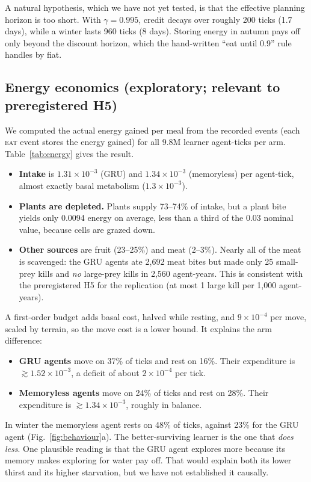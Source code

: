 \documentclass[10pt]{article}
\begin{document}
A natural hypothesis, which we have not yet tested, is that the effective planning horizon is too short. With
$\gamma=0.995$, credit decays over roughly 200 ticks (1.7 days), while a winter lasts 960 ticks (8 days).
Storing energy in autumn pays off only beyond the discount horizon, which the hand-written ``eat until 0.9'' rule
handles by fiat.

\subsection{Energy economics (exploratory; relevant to preregistered H5)}
\label{sec:energy}

We computed the actual energy gained per meal from the recorded events (each \textsc{eat} event stores the energy
gained) for all 9.8M learner agent-ticks per arm. Table~\ref{tab:energy} gives the result.
\begin{itemize}
\item \textbf{Intake} is $1.31\times10^{-3}$ (GRU) and $1.34\times10^{-3}$ (memoryless) per agent-tick, almost
exactly basal metabolism ($1.3\times10^{-3}$).
\item \textbf{Plants are depleted.} Plants supply 73--74\% of intake, but a plant bite yields only 0.0094 energy on
average, less than a third of the 0.03 nominal value, because cells are grazed down.
\item \textbf{Other sources} are fruit (23--25\%) and meat (2--3\%). Nearly all of the meat is scavenged: the GRU
agents ate 2{,}692 meat bites but made only 25 small-prey kills and \emph{no} large-prey kills in 2{,}560
agent-years. This is consistent with the preregistered H5 for the replication (at most 1 large kill per 1{,}000
agent-years).
\end{itemize}

A first-order budget adds basal cost, halved while resting, and $9\times10^{-4}$ per move, scaled by terrain, so the
move cost is a lower bound. It explains the arm difference:
\begin{itemize}
\item \textbf{GRU agents} move on 37\% of ticks and rest on 16\%. Their expenditure is $\gtrsim1.52\times10^{-3}$,
a deficit of about $2\times10^{-4}$ per tick.
\item \textbf{Memoryless agents} move on 24\% of ticks and rest on 28\%. Their expenditure is
$\gtrsim1.34\times10^{-3}$, roughly in balance.
\end{itemize}
In winter the memoryless agent rests on 48\% of ticks, against 23\% for the GRU agent (Fig.~\ref{fig:behaviour}a).
The better-surviving learner is the one that \emph{does less}. One plausible reading is that the GRU agent explores
more because its memory makes exploring for water pay off. That would explain both its lower thirst and its higher
starvation, but we have not established it causally.
\end{document}
